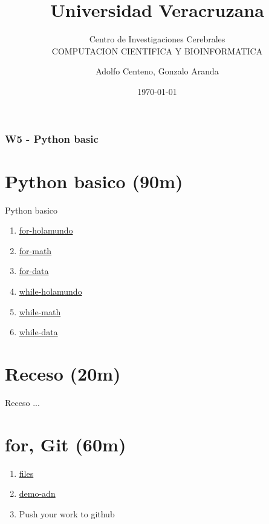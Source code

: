 \documentclass{beamer}
\begin{document}
\title{Universidad Veracruzana}  
\subtitle{Centro de Investigaciones Cerebrales\\COMPUTACION CIENTIFICA Y BIOINFORMATICA}
\author{Adolfo Centeno, Gonzalo Aranda}
\date{\today} 

\begin{frame}
\titlepage
\end{frame}

\begin{frame}\frametitle{W5 - Python basic}
\tableofcontents
\end{frame} 


\section{Python basico (90m) }

\begin{frame}


Python basico

\begin{enumerate}
\item
	\href{https://github.com/adsoftsito/python/blob/master/w3/lists.py}{for-holamundo}

\item
	 \href{https://github.com/adsoftsito/python/blob/master/w3/dictionaries.py}{for-math}
\item
	\href{https://github.com/adsoftsito/python/blob/master/w3/tuples.py}{for-data}

\item
	\href{https://github.com/adsoftsito/python/blob/master/w3/lists.py}{while-holamundo}

\item
	 \href{https://github.com/adsoftsito/python/blob/master/w3/dictionaries.py}{while-math}
\item
	\href{https://github.com/adsoftsito/python/blob/master/w3/tuples.py}{while-data}
	
\end{enumerate} 


\end{frame}


\section{Receso  (20m) }

\begin{frame}


Receso ...

\end{frame}


\section{for, Git (60m) }

\begin{frame}

\begin{enumerate}
\item
	\href{https://github.com/adsoftsito/python/blob/master/w3/for.py}{files}

\item
	\href{https://github.com/adsoftsito/python/blob/master/w3/for.py}{demo-adn}

\item
	Push your work to github

\end{enumerate} 


\end{frame}
\end{document}

